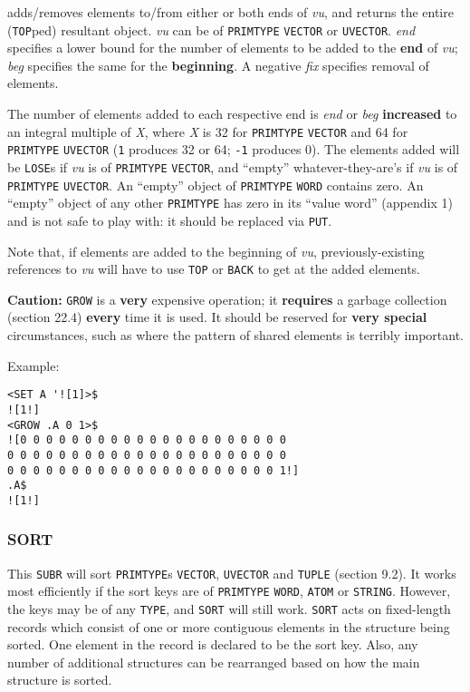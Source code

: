 \documentclass[a4paper]{scrbook}
\begin{document}
 adds/removes elements to/from either or both ends of \emph{vu}, and returns the entire
(\texttt{TOP}ped) resultant object. \emph{vu} can be of \texttt{PRIMTYPE} \texttt{VECTOR} or \texttt{UVECTOR}. \emph{end}
specifies a lower bound for the number of elements to be added to the \textbf{end} of \emph{vu}; \emph{beg} specifies the
same for the \textbf{beginning}. A negative \emph{fix} specifies removal of elements.

The number of elements added to each respective end is \emph{end} or \emph{beg} \textbf{increased} to an integral multiple
of \emph{X}, where \emph{X} is 32 for \texttt{PRIMTYPE} \texttt{VECTOR} and 64 for \texttt{PRIMTYPE} \texttt{UVECTOR}
(\texttt{1} produces 32 or 64; \texttt{-1} produces 0). The elements added will be \texttt{LOSE}s if
\emph{vu} is of \texttt{PRIMTYPE} \texttt{VECTOR}, and ``empty'' whatever-they-are's if \emph{vu} is of \texttt{PRIMTYPE}
\texttt{UVECTOR}. An ``empty'' object of \texttt{PRIMTYPE} \texttt{WORD} contains zero. An ``empty'' object of any other
\texttt{PRIMTYPE} has zero in its ``value word'' (appendix 1) and is not safe to play with: it should be replaced via
\texttt{PUT}.

Note that, if elements are added to the beginning of \emph{vu}, previously-existing references to \emph{vu} will have to
use \texttt{TOP} or \texttt{BACK} to get at the added elements.

\textbf{Caution:} \texttt{GROW} is a \textbf{very} expensive operation; it \textbf{requires} a garbage collection (section
22.4) \textbf{every} time it is used. It should be reserved for \textbf{very special} circumstances, such as where the
pattern of shared elements is terribly important.

Example:

\begin{verbatim}
<SET A '![1]>$
![1!]
<GROW .A 0 1>$
![0 0 0 0 0 0 0 0 0 0 0 0 0 0 0 0 0 0 0 0 0
0 0 0 0 0 0 0 0 0 0 0 0 0 0 0 0 0 0 0 0 0 0
0 0 0 0 0 0 0 0 0 0 0 0 0 0 0 0 0 0 0 0 0 1!]
.A$
![1!]
\end{verbatim}

\subsubsection{SORT}\label{sort}

 This \texttt{SUBR} will sort \texttt{PRIMTYPE}s \texttt{VECTOR}, \texttt{UVECTOR} and
\texttt{TUPLE} (section 9.2). It works most efficiently if the sort keys are of \texttt{PRIMTYPE} \texttt{WORD},
\texttt{ATOM} or \texttt{STRING}. However, the keys may be of any \texttt{TYPE}, and \texttt{SORT} will still work.
\texttt{SORT} acts on fixed-length records which consist of one or more contiguous elements in the structure being sorted.
One element in the record is declared to be the sort key. Also, any number of additional structures can be rearranged based
on how the main structure is sorted.
\end{document}
